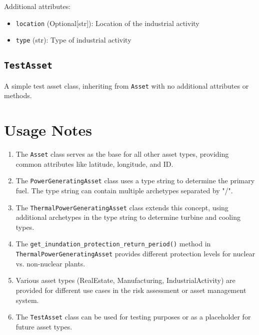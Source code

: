 \documentclass{article}
\begin{document}
Additional attributes:
\begin{itemize}
    \item \texttt{location} (Optional[str]): Location of the industrial activity
    \item \texttt{type} (str): Type of industrial activity
\end{itemize}

\subsection{\texttt{TestAsset}}
A simple test asset class, inheriting from \texttt{Asset} with no additional attributes or methods.

\section{Usage Notes}

\begin{enumerate}
    \item The \texttt{Asset} class serves as the base for all other asset types, providing common attributes like latitude, longitude, and ID.
    
    \item The \texttt{PowerGeneratingAsset} class uses a type string to determine the primary fuel. The type string can contain multiple archetypes separated by "/".
    
    \item The \texttt{ThermalPowerGeneratingAsset} class extends this concept, using additional archetypes in the type string to determine turbine and cooling types.
    
    \item The \texttt{get\_inundation\_protection\_return\_period()} method in \texttt{ThermalPowerGeneratingAsset} provides different protection levels for nuclear vs. non-nuclear plants.
    
    \item Various asset types (RealEstate, Manufacturing, IndustrialActivity) are provided for different use cases in the risk assessment or asset management system.
    
    \item The \texttt{TestAsset} class can be used for testing purposes or as a placeholder for future asset types.
\end{enumerate}
\end{document}

